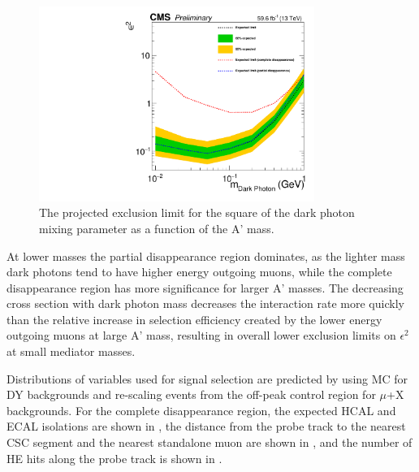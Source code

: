 \begin{figure}[htbp]
	\centering
	\includegraphics[width=0.8\textwidth]{figures/Limit_AllRegions.pdf}
	\caption[Projected Exclusion Limits on the Dark Photon Mixing Parameter]{The projected exclusion limit for the square of the dark photon mixing parameter as a function of the A' mass.}
	\label{fig:limits}
\end{figure}

At lower masses the partial disappearance region dominates, as the lighter mass dark photons tend to have higher energy outgoing muons, while the complete disappearance region has more significance for larger A' masses. 
The decreasing cross section with dark photon mass decreases the interaction rate more quickly than the relative increase in selection efficiency created by the lower energy outgoing muons at large A' mass, resulting in overall lower exclusion limits on $\epsilon^{2}$ at small mediator masses. 

Distributions of variables used for signal selection are predicted by using MC for DY backgrounds and re-scaling events from the off-peak control region for $\mu$+X backgrounds.
For the complete disappearance region, the expected HCAL and ECAL isolations are shown in , the distance from the probe track to the nearest CSC segment and the nearest standalone muon are shown in , and the number of HE hits along the probe track is shown in .

